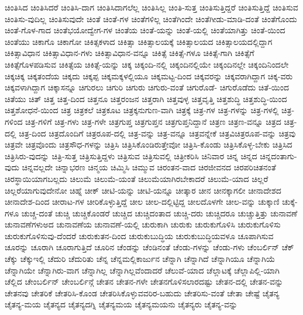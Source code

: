 {ಚಿಂತಿಸಿದ
ಚಿಂತಿಸಿದರೆ
ಚಿಂತಿಸಿ-ದಾಗ
ಚಿಂತಿಸಿದಾಗಲೆಲ್ಲ
ಚಿಂತಿಸಿಲ್ಲ
ಚಿಂತಿ-ಸುತ್ತ
ಚಿಂತಿಸುತ್ತಿದ್ದರೆ
ಚಿಂತಿಸುತ್ತಿದ್ದೆ
ಚಿಂತಿಸುವ
ಚಿಂತಿಸು-ವುದಿಲ್ಲ
ಚಿಂತಿಸುವುದೇ
ಚಿಂತೆ
ಚಿಂತೆ-ಗಳ
ಚಿಂತೆಗಳಿಲ್ಲ
ಚಿಂತೆಗಿಂದೇ
ಚಿಂತೆಗೀಡು-ಮಾಡಿ-ದಂತೆ
ಚಿಂತೆಗೊಂದು
ಚಿಂತೆ-ಗೊಳ-ಗಾದ
ಚಿಂತೆಭಯೋದ್ವೇಗ-ಗಳ
ಚಿಂತೆಯ
ಚಿಂತೆ-ಯನ್ನು
ಚಿಂತೆ-ಯಲ್ಲಿ
ಚಿಂತೆಯಾಗಿತ್ತು
ಚಿಂತೆ-ಯಿಂದ
ಚಿಂತೆಯು
ಚಿಕಾಗೊ
ಚಿಕಾಗೋ
ಚಿಕಿತ್ಸಕಳಾದ
ಚಿಕಿತ್ಸಾ
ಚಿಕಿತ್ಸಾಲಯಕ್ಕೆ
ಚಿಕಿತ್ಸಾಲಯದ
ಚಿಕಿತ್ಸಾಲಯದಲ್ಲಿದ್ದಾಗ
ಚಿಕಿತ್ಸಾವಿಧಾನ
ಚಿಕಿತ್ಸಾವಿಧಾನ-ಗಳು
ಚಿಕಿತ್ಸಾವಿಧಾನ-ವನ್ನೂ
ಚಿಕಿತ್ಸೆ
ಚಿಕಿತ್ಸೆ-ಗಳೂ
ಚಿಕಿತ್ಸೆ-ಗಾಗಿ
ಚಿಕಿತ್ಸೆಗೆ
ಚಿಕಿತ್ಸೆಗೊಳಪಡಿಸುವ
ಚಿಕಿತ್ಸೆಯ
ಚಿಕಿತ್ಸೆ-ಯನ್ನು
ಚಿಕ್ಕ
ಚಿಕ್ಕಂದಿ-ನಲ್ಲಿ
ಚಿಕ್ಕಂದಿನಲ್ಲಿಯೇ
ಚಿಕ್ಕಂದಿನಲ್ಲೇ
ಚಿಕ್ಕಂದಿನಿಂದಲೇ
ಚಿಕ್ಕಚಿಕ್ಕ
ಚಿಕ್ಕತಂದೆಯ
ಚಿಕ್ಕದು
ಚಿಕ್ಕಪ್ಪ
ಚಿಕ್ಕಮಕ್ಕಳಲ್ಲಿಯೂ
ಚಿಕ್ಕಮಟ್ಟ-ದಿಂದ
ಚಿಕ್ಕವರನ್ನು
ಚಿಕ್ಕವರಾಗಿದ್ದಾಗ
ಚಿಕ್ಕ-ವರು
ಚಿಕ್ಕವಳಾಗಿದ್ದಾಗ
ಚಿಕ್ಕಾಸನ್ನೂ
ಚಿಗುರಲು
ಚಿಗುರಿ
ಚಿಗುರು
ಚಿಗುರು-ವಂತೆ
ಚಿಗುರೊಡೆ-
ಚಿಗುರೊಡೆದು
ಚಿತೆ-ಯಿಂದ
ಚಿತೆಯು
ಚಿತ್
ಚಿತ್ತ
ಚಿತ್ತ-ದಿಂದ
ಚಿತ್ತನೂ
ಚಿತ್ತರಂಜನ
ಚಿತ್ತರಾಗಿ
ಚಿತ್ತವುಳ್ಳ
ಚಿತ್ತವೃತ್ತಿ
ಚಿತ್ತಶುದ್ಧಿ
ಚಿತ್ತಶುದ್ಧಿ-ಯಿಂದ
ಚಿತ್ತಶೋಧನೆ-ಯಿಂದ
ಚಿತ್ರ
ಚಿತ್ರಕಲೆ
ಚಿತ್ರಕೂಟ
ಚಿತ್ರಕ್ಕನುಗುಣ-ವಾಗಿ
ಚಿತ್ರಕ್ಕೆ
ಚಿತ್ರ-ಗಳ
ಚಿತ್ರ-ಗಳನ್ನು
ಚಿತ್ರ-ಗಳಲ್ಲಿ
ಚಿತ್ರ-ಗಳಿಂದ
ಚಿತ್ರ-ಗಳಿಗೆ
ಚಿತ್ರ-ಗಳು
ಚಿತ್ರ-ಗಳೇ
ಚಿತ್ರಗುಪ್ತ
ಚಿತ್ರಗುಪ್ತನ
ಚಿತ್ರಗುಪ್ತನಿದ್ದಾನೆ
ಚಿತ್ರಣ
ಚಿತ್ರಣ-ವನ್ನೂ
ಚಿತ್ರದ
ಚಿತ್ರ-ದಲ್ಲಿ
ಚಿತ್ರ-ದಿಂದ
ಚಿತ್ರದೊಂದಿಗೆ
ಚಿತ್ರರೂಪ-ದಲ್ಲಿ
ಚಿತ್ರ-ವನ್ನು
ಚಿತ್ರ-ವನ್ನೂ
ಚಿತ್ರವನ್ನೇಕೆ
ಚಿತ್ರವಿಚಿತ್ರರೂಪ-ವನ್ನು
ಚಿತ್ರವು
ಚಿತ್ರವೇ
ಚಿತ್ರವೊಂದು
ಚಿತ್ರಸೌಧ-ಗಳನ್ನು
ಚಿತ್ರಿಸಿ
ಚಿತ್ರಿಸಿಕೊಂಡಿರುತ್ತೇವೋ
ಚಿತ್ರಿಸಿ-ಕೊಂಡು
ಚಿತ್ರಿಸಿಕೊಳ್ಳ-ಬೇಕು
ಚಿತ್ರಿಸಿದ
ಚಿತ್ರಿಸಿರು-ವುದನ್ನು
ಚಿತ್ರಿ-ಸುತ್ತ
ಚಿತ್ರಿಸುತ್ತಿದ್ದಳು
ಚಿತ್ರಿಸುವ
ಚಿತ್ರಿಸುವಲ್ಲಿ
ಚಿತ್ರೀಕರಿಸಿ
ಚಿನಿವಾರ
ಚಿನ್ನ
ಚಿನ್ನದ
ಚಿನ್ನದಂತಾಗು-ವುದು
ಚಿನ್ನವಲ್ಲದೇ
ಚಿನ್ನಾಭರಣ
ಚಿನ್ಮಯ
ಚಿಮ್ಮಿಸಿ
ಚಿಮ್ಮುವ
ಚಿರಂತನ-ವಾದ
ಚಿರಜೀವನದ
ಚಿರಪರಿಚಿತನಂತೆ
ಚಿರಸ್ಥಾಯಿಯಾಗಬಲ್ಲದು
ಚಿಲುಮೆ
ಚಿಲುಮೆ-ಯಂತೆ
ಚಿಲುಮೆಯಾಗಿರಬೇಕಾದರೆ
ಚಿಲುಮೆ-ಯಾದ
ಚಿಲ್ಲರೆ
ಚಿಲ್ಲರೆಯಾಗುವುದೇನೋ
ಚಿಹ್ನೆ
ಚೀಕ್
ಚೀಟಿ-ಯನ್ನು
ಚೀಟಿ-ಯನ್ನೂ
ಚೀತ್ಕಾರ
ಚೀನ
ಚೀನಕ್ಕಾಗಲೀ
ಚೀನಾದೇಶದ
ಚೀನಾದೇಶ-ದಿಂದ
ಚೀರಾಟ-ಗಳ
ಚೀರಿಕೊಳ್ಳುತ್ತಿದ್ದೆ
ಚೀಲ
ಚೀಲ-ದಲ್ಲಿಟ್ಟಿದ್ದ
ಚೀಲದೊಳಗೇ
ಚೀಲ-ವನ್ನು
ಚುಕ್ಕಾಣಿ
ಚುಕ್ಕೆ-ಗಳೂ
ಚುಚ್ಚ-ದಂತೆ
ಚುಚ್ಚಿ
ಚುಚ್ಚಿಕೊಂಡರೆ
ಚುಚ್ಚಿದ
ಚುಚ್ಚಿದಂತಾದ
ಚುಚ್ಚಿ-ದರು
ಚುಚ್ಚಿದರೂ
ಚುಚ್ಚುತ್ತಿತ್ತು
ಚುನಾವಣೆ
ಚುನಾವಣೆಗಳುಅದ
ಚುನಾವಣೆಯ
ಚುನಾವಣೆ-ಯಲ್ಲಿ
ಚುರುಕಾಗಿ
ಚುರುಕು
ಚುರುಕುಗೊಳಿಸಿ
ಚುರುಕುಗೊಳಿಸು
ಚುರುಕುಗೊಳಿಸುವು-ದೆಂದರೆ
ಚುರುಕುತನ-ದಿಂದ
ಚುರುಕುಬುದ್ಧಿಯ
ಚುರುಕುಬುದ್ಧಿಯವಳೂ
ಚೂಪಾಗಿಸುವ
ಚೂರನ್ನು
ಚೂರಾಗಿ
ಚೂರಾಗುತ್ತಿದೆ
ಚೂರಿನ
ಚೆಂಡನ್ನು
ಚೆಂಡಿನಂತೆ
ಚೆಂಡು-ಗಳನ್ನು
ಚೆಂಡು-ಗಳು
ಚೆಂಬರ್ಲಿನ್
ಚೆಕ್
ಚೆಕ್ಕು
ಚೆಕ್ಕುಇಲ್ಲಿ
ಚೆದುರಿ
ಚೆದುರಿತು
ಚೆನ್ನ
ಚೆನ್ನಮಲ್ಲಿಕಾರ್ಜುನ
ಚೆನ್ನಾಗಿ
ಚೆನ್ನಾಗಿದೆ
ಚೆನ್ನಾಗಿಯೂ
ಚೆನ್ನಾಗಿಯೆ
ಚೆನ್ನಾಗಿಯೇ
ಚೆನ್ನಾಗಿರು-ವಾಗ
ಚೆನ್ನಾಗಿಲ್ಲ
ಚೆನ್ನಾಗಿಲ್ಲವೆಂದಾದರೆ
ಚೆಲುವೆ-ಯಾದ
ಚೆಲ್ಲಾಟಕ್ಕೆ
ಚೆಲ್ಲಾಪಿಲ್ಲಿ-ಯಾಗಿ
ಚೆಲ್ಲಿದ
ಚೇಂಬರ್ಲಿನ್
ಚೇಂಬರ್ಲಿನ್ಗೆ
ಚೇತನ
ಚೇತನ-ಗಳೇ
ಚೇತನಗೊಳಿಸಲಾರದಷ್ಟು
ಚೇತನ-ದಲ್ಲಿ
ಚೇತನ-ವನ್ನು
ಚೇತನವು
ಚೇತರಿಕೆ
ಚೇತರಿಸಿ-ಕೊಂಡ
ಚೇತರಿಸಿಕೊಳ್ಳುವವರಿರ-ಬಹುದು
ಚೇತರಿಸು-ವಂತೆ
ಚೇತಾ
ಚೇಷ್ಟೆ
ಚೈತನ್ಯ
ಚೈತನ್ಯ-ಮಯ
ಚೈತನ್ಯದ
ಚೈತನ್ಯದಗ್ನಿ
ಚೈತನ್ಯಮಯ
ಚೈತನ್ಯಮಯನು
ಚೈತನ್ಯರು
ಚೈತನ್ಯ-ವನ್ನು
}
